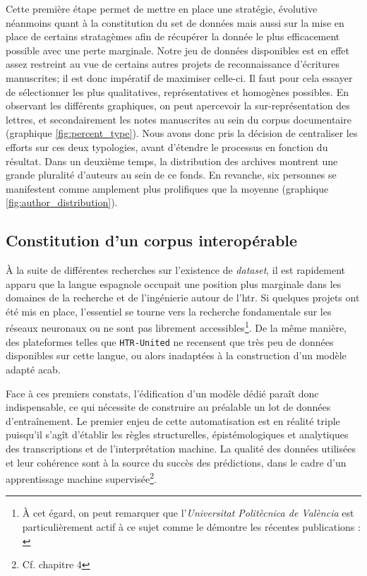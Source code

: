 	Cette première étape permet de mettre en place une stratégie, évolutive néanmoins quant à la constitution du set de données mais aussi sur la mise en place de certains stratagèmes afin de récupérer la donnée le plus efficacement possible avec une perte marginale. Notre jeu de données disponibles est en effet assez restreint au vue de certains autres projets de reconnaissance d'écritures manuscrites; il est donc impératif de maximiser celle-ci. Il faut pour cela essayer de sélectionner les plus qualitatives, représentatives et homogènes possibles. En observant les différents graphiques, on peut apercevoir la sur-représentation des lettres, et secondairement les notes manuscrites au sein du corpus documentaire (graphique \ref{fig:percent_type}). Nous avons donc pris la décision de centraliser les efforts sur ces deux typologies, avant d'étendre le processus en fonction du résultat. Dans un deuxième temps, la distribution des archives montrent une grande pluralité d'auteurs au sein de ce fonds. En revanche, six personnes se manifestent comme amplement plus prolifiques que la moyenne (graphique \ref{fig:author_distribution}).
	
	\subsection{Constitution d'un corpus interopérable}
	
	À la suite de différentes recherches sur l'existence de \textit{dataset}, il est rapidement apparu que la langue espagnole occupait une position plus marginale dans les domaines de la recherche et de l'ingénierie autour de l'\gls{htr}. Si quelques projets ont été mis en place, l'essentiel se tourne vers la recherche fondamentale sur les réseaux neuronaux ou ne sont pas librement accessibles\footnote{À cet égard, on peut remarquer que l'\textit{Universitat Politècnica de València} est particulièrement actif à ce sujet comme le démontre les récentes publications : \cite{granellTranscriptionSpanishHistorical2018, espana-boqueraSpanishDatasetReproducible2022}}. De la même manière, des plateformes telles que \texttt{HTR-United} ne recensent que très peu de données disponibles sur cette langue, ou alors inadaptées à la construction d'un modèle adapté \gls{acab}.
	
	Face à ces premiers constats, l'édification d'un modèle dédié paraît donc indispensable, ce qui nécessite de construire au préalable un lot de données d'entraînement. Le premier enjeu de cette automatisation est en réalité triple puisqu'il s'agît d'établir les règles structurelles, épistémologiques et analytiques des transcriptions et de l'interprétation machine. La qualité des données utilisées et leur cohérence sont à la source du succès des prédictions, dans le cadre d'un apprentissage machine supervisée\footnote{Cf. chapitre 4}.
	
